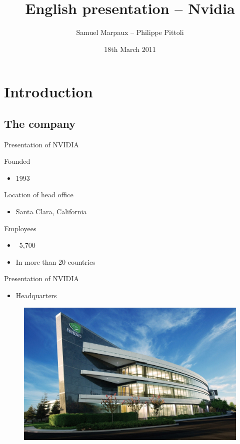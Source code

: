\documentclass{beamer}
\date{18th March 2011}
\author{Samuel Marpaux -- Philippe Pittoli}
\title[Nvidia]{English presentation -- Nvidia}
\begin{document}

\section{Introduction}
\subsection{The company}
\begin{frame}{Presentation of NVIDIA}
	\transdissolve[duration=0.03]

	\begin{block}{Founded}
		\begin{itemize}
			\item<+->{1993}
		\end{itemize}
	\end{block}	
	\pause
	\begin{block}{Location of head office}
		\begin{itemize}
			\item<+->{Santa Clara, California}
		\end{itemize}
	\end{block}
	\begin{block}{Employees}
		\begin{itemize}
			\item<+->{~5,700}
			\item<+->{In more than 20 countries}
		\end{itemize}
	\end{block}
\end{frame}

\begin{frame}{Presentation of NVIDIA}
	\transdissolve[duration=0.08]
	\begin{itemize}
		\item<+->{Headquarters}
	\end{itemize}
	\begin{figure}[h]
		\includegraphics[width=1.00\textheight]{NVIDIA_HEADQUARTERS.jpg}
	\end{figure}
\end{frame}
\end{document}
